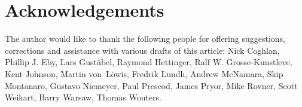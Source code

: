 \documentclass{howto}
\begin{document}
\section{Acknowledgements \label{acks}}

The author would like to thank the following people for offering
suggestions, corrections and assistance with various drafts of this
article: Nick Coghlan, Phillip J. Eby, Lars Gust\"abel, Raymond Hettinger, Ralf
W. Grosse-Kunstleve, Kent Johnson, Martin von~L\"owis, Fredrik Lundh,
Andrew McNamara, Skip Montanaro,
Gustavo Niemeyer, Paul Prescod, James Pryor, Mike Rovner, Scott Weikart, Barry
Warsaw, Thomas Wouters.
\end{document}
